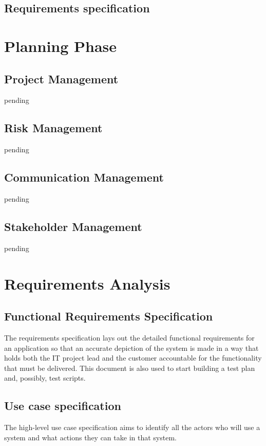 \documentclass[a4paper,12pt]{article}
\begin{document}
\begin{samepage}
\subsection{Requirements specification}

\section {Planning Phase}

\subsection {Project Management}
pending
\subsection {Risk Management}
pending
\subsection {Communication Management}
pending
\subsection {Stakeholder Management}
pending
\newpage
\section {Requirements Analysis}

\subsection {Functional Requirements Specification}

The requirements specification lays out the detailed functional requirements for an application so that an accurate depiction of the system is made in a way that holds both the IT project lead and the customer accountable for the functionality that must be delivered.  This document is also used to start building a test plan and, possibly, test scripts.

\subsection {Use case specification}
The high-level use case specification aims to identify all the actors who will use a system and what actions they can take in that system.

\newpage

\end{samepage}
\end{document}
